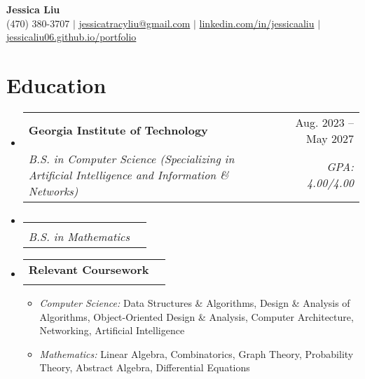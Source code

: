 \documentclass[letterpaper,11pt]{article}
\makeatletter
\newcommand{\resumeItem}[1]{
  \item\small{
    {#1 \vspace{-2pt}}
  }
}
\newcommand{\resumeSubheading}[4]{
  \vspace{-2pt}\item
    \begin{tabular*}{0.99\textwidth}[t]{l@{\extracolsep{\fill}}r}
      \textbf{#1} & #2 \\
      \textsl{\small#3} & \textsl{\small #4} \\
    \end{tabular*}\vspace{-7pt}
}
\newcommand{\resumeSubHeadingListStart}{\begin{itemize}[leftmargin=*, label={}]}
\newcommand{\resumeSubHeadingListEnd}{\end{itemize}}
\newcommand{\resumeItemListStart}{\begin{itemize}[leftmargin=*, labelsep=0.75em]}
\newcommand{\resumeItemListEnd}{\end{itemize}\vspace{-7pt}}
\makeatother
\begin{document}

\begin{center}
    \textbf{\Huge Jessica Liu} \\ \vspace{1pt}
    \small 
        (470) 380-3707 $|$
        \href{mailto:jessicatracyliu@gmail.com}{jessicatracyliu@gmail.com} $|$
        \href{https://www.linkedin.com/in/jessicaaliu/}{linkedin.com/in/jessicaaliu} $|$
        \href{https://jessicaliu06.github.io/portfolio}{jessicaliu06.github.io/portfolio}
\end{center}

\vspace{-0.75cm}
\section{Education}
  \resumeSubHeadingListStart
    \resumeSubheading
      {Georgia Institute of Technology}{Aug. 2023 -- May 2027}
      {B.S. in Computer Science (Specializing in Artificial Intelligence and Information \& Networks)}{GPA: 4.00/4.00}
    \vspace{-1.15cm}
    \resumeSubheading
      {}{}
      {B.S. in Mathematics}{}

    \vspace{-0.5cm}
    \resumeSubheading
      {\small Relevant Coursework}{}
      {}{}
      \vspace{-0.7cm}
      \resumeItemListStart
        \resumeItem
            {\textsl{Computer Science:} Data Structures \& Algorithms, Design \& Analysis of Algorithms, Object-Oriented Design \& Analysis, Computer Architecture, Networking, Artificial Intelligence}
        \resumeItem
            {\textsl{Mathematics:} Linear Algebra, Combinatorics, Graph Theory, Probability Theory, Abstract Algebra, Differential Equations}
      \resumeItemListEnd
  \resumeSubHeadingListEnd

\end{document}
